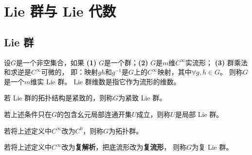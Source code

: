 \chapter{Lie 群与 Lie 代数}\label{appx:Lie-group}

\section{Lie 群}\label{chlg:sec_definition}

\begin{definition}\label{chlg:def_lg}
    设$G$是一个非空集合，如果
    {\bfseries (1)} $G$是一个群；{\bfseries (2)} $G$是$m$维$C^\infty$实流形；
    {\bfseries (3)} 群乘法和求逆是$C^\infty$可微的，
    即：映射$gh$和$g^{-1}$是$G$上的$C^\infty$映射，其中$\forall g,h\in G$。
    则称$G$是一个$m$维实 Lie 群。
     Lie 群{\heiti 维数}是指它作为流形的维数。

    若 Lie 群的拓扑结构是紧致的，则称$G$为{\heiti 紧致 Lie 群}。
    
    若上述条件只在$G$的包含幺元局部连通开集$U$成立，则称$U$是{\heiti 局部 Lie 群}。
       
    若将上述定义中$C^\infty$改为$C^0$，则称$G$为{\heiti 拓扑群}。
    
    若将上述定义中$C^\infty$改为\textbf{复解析}，把底流形改为\textbf{复流形}，
    则称$G$为{\heiti 复 Lie 群}。
\end{definition}